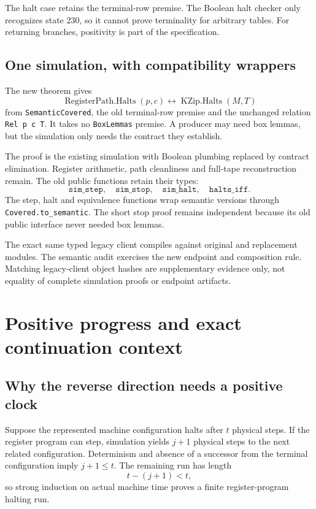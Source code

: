 \documentclass[11pt,letterpaper]{article}
\newcommand{\code}[1]{\texttt{#1}}
\begin{document}
The halt case retains the terminal-row premise. The Boolean halt checker only
recognizes state 230, so it cannot prove terminality for arbitrary tables.
For returning branches, positivity is part of the specification.

\subsection{One simulation, with compatibility wrappers}

The new theorem gives
\[
 \operatorname{RegisterPath.Halts}(p,c)
 \longleftrightarrow\operatorname{KZip.Halts}(M,T)
\]
from \code{SemanticCovered}, the old terminal-row premise and the unchanged
relation \code{Rel p c T}. It takes no \code{BoxLemmas} premise. A producer may
need box lemmas, but the simulation only needs the contract they establish.

The proof is the existing simulation with Boolean plumbing replaced by
contract elimination. Register arithmetic, path cleanliness and full-tape
reconstruction remain. The old public functions retain their types:
\[
 \code{sim\_step},\quad\code{sim\_stop},\quad
 \code{sim\_halt},\quad\code{halts\_iff}.
\]
The step, halt and equivalence functions wrap semantic versions through
\code{Covered.to\_semantic}. The short stop proof remains independent because
its old public interface never needed box lemmas.

The exact same typed legacy client compiles against original and replacement
modules. The semantic audit exercises the new endpoint and composition rule.
Matching legacy-client object hashes are supplementary evidence only, not
equality of complete simulation proofs or endpoint artifacts.

\section{Positive progress and exact continuation context}

\subsection{Why the reverse direction needs a positive clock}

Suppose the represented machine configuration halts after \(t\) physical steps.
If the register program can step, simulation yields \(j+1\) physical steps to
the next related configuration. Determinism and absence of a successor from
the terminal configuration imply \(j+1\le t\). The remaining run has length
\[
 t-(j+1)<t,
\]
so strong induction on actual machine time proves a finite register-program
halting run.
\end{document}
